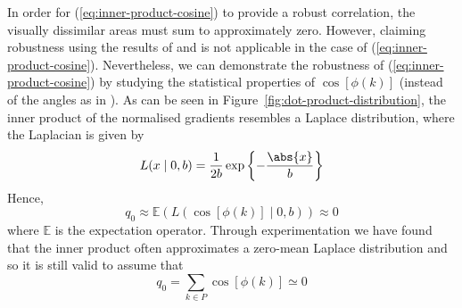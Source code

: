 In order for (\ref{eq:inner-product-cosine}) to provide a robust correlation, the visually dissimilar areas must sum to approximately zero. However, claiming robustness using the results of \cite{RefWorks:6} and \cite{RefWorks:68} is not applicable in the case of (\ref{eq:inner-product-cosine}). Nevertheless, we can demonstrate the robustness of (\ref{eq:inner-product-cosine}) by studying the statistical properties of $\cos[\phi (k)]$ (instead of the angles as in \cite{RefWorks:6, RefWorks:68}). As can be seen in Figure~\ref{fig:dot-product-distribution}, the inner product of the normalised gradients resembles a Laplace distribution, where the Laplacian is given by
\begin{equation}\label{eq:laplace-distribution}
    L(x \mid 0, b) = \frac{1}{2b} \exp \left\{ - \frac{\abs{x}}{b} \right\}
\end{equation}
Hence,
\begin{equation}\label{eq:laplace-approx-zero}
    q_0 \approx \mathbb{E} \left( L(\cos[\phi (k)] \mid 0, b) \right) \approx 0
\end{equation}
where $\mathbb{E}$ is the expectation operator. Through experimentation we have found that the inner product often approximates a zero-mean Laplace distribution and so it is still valid to assume that
\begin{equation}\label{eq:inner-product-approx-zero}
    q_0 = \sum_{k \in P} \cos [\phi (k)] \simeq 0
\end{equation}
